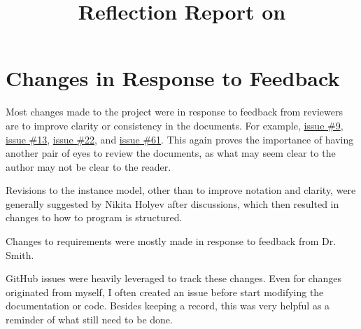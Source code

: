 \documentclass{article}
\title{Reflection Report on \progname}
\author{\authname}
\date{}
\begin{document}
\maketitle


\section{Changes in Response to Feedback}

Most changes made to the project were in response to feedback from reviewers are to improve clarity or consistency in the documents. For example, \href{https://github.com/omltcat/turbulent-flow/issues/9}{issue \#9}, \href{https://github.com/omltcat/turbulent-flow/issues/13}{issue \#13}, \href{https://github.com/omltcat/turbulent-flow/issues/22}{issue \#22}, and \href{https://github.com/omltcat/turbulent-flow/issues/61}{issue \#61}. This again proves the importance of having another pair of eyes to review the documents, as what may seem clear to the author may not be clear to the reader.

Revisions to the instance model, other than to improve notation and clarity, were generally suggested by Nikita Holyev after discussions, which then resulted in changes to how to program is structured.

Changes to requirements were mostly made in response to feedback from Dr. Smith. 

GitHub issues were heavily leveraged to track these changes. Even for changes originated from myself, I often created an issue before start modifying the documentation or code. Besides keeping a record, this was very helpful as a reminder of what still need to be done. 


\end{document}
